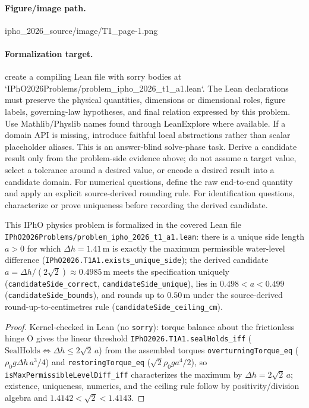 \paragraph{Figure/image path.}
ipho\_2026\_source/image/T1\_page-1.png

\paragraph{Formalization target.}
create a compiling Lean file with sorry bodies at `IPhO2026Problems/problem\_ipho\_2026\_t1\_a1.lean`.
The Lean declarations must preserve the physical quantities, dimensions or dimensional roles, figure labels, governing-law hypotheses, and final relation expressed by this problem.
Use Mathlib/Physlib names found through LeanExplore where available. If a domain API is missing, introduce faithful local abstractions rather than scalar placeholder aliases.
This is an answer-blind solve-phase task. Derive a candidate result only from the problem-side evidence above; do not assume a target value, select a tolerance around a desired value, or encode a desired result into a candidate domain.
For numerical questions, define the raw end-to-end quantity and apply an explicit source-derived rounding rule. For identification questions, characterize or prove uniqueness before recording the derived candidate.

\begin{theorem}
\label{thm:physics:ipho_2026_t1_a1:target}
\leanok
This IPhO physics problem is formalized in the covered Lean file
\texttt{IPhO2026Problems/problem\_ipho\_2026\_t1\_a1.lean}: there is a unique
side length $a > 0$ for which $\Delta h = 1.41\,\mathrm{m}$ is exactly the
maximum permissible water-level difference
(\texttt{IPhO2026.T1A1.exists\_unique\_side}); the derived candidate
$a = \Delta h/(2\sqrt{2}) \approx 0.4985\,\mathrm{m}$ meets the specification
uniquely (\texttt{candidateSide\_correct}, \texttt{candidateSide\_unique}),
lies in $0.498 < a < 0.499$ (\texttt{candidateSide\_bounds}), and rounds up to
$0.50\,\mathrm{m}$ under the source-derived round-up-to-centimetres rule
(\texttt{candidateSide\_ceiling\_cm}).
\end{theorem}
\begin{proof}
\leanok
Kernel-checked in Lean (no \texttt{sorry}): torque balance about the
frictionless hinge O gives the linear threshold
\texttt{IPhO2026.T1A1.sealHolds\_iff} ($\mathrm{SealHolds} \iff
\Delta h \le 2\sqrt{2}\,a$) from the assembled torques
\texttt{overturningTorque\_eq} ($\rho_0 g \Delta h\, a^3/4$) and
\texttt{restoringTorque\_eq} ($\sqrt{2}\rho_0 g a^4/2$), so
\texttt{isMaxPermissibleLevelDiff\_iff} characterizes the maximum by
$\Delta h = 2\sqrt{2}\,a$; existence, uniqueness, numerics, and the ceiling
rule follow by positivity/division algebra and $1.4142 < \sqrt2 < 1.4143$.
\end{proof}
